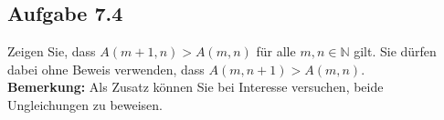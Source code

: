 \subsection*{Aufgabe 7.4}
Zeigen Sie, dass $A(m+1,n) > A(m,n)$ für alle $m,n \in \mathbb{N}$ gilt. Sie dürfen dabei ohne Beweis verwenden, dass $A(m,n+1) > A(m,n)$.\\
\textbf{Bemerkung:} Als Zusatz können Sie bei Interesse versuchen, beide Ungleichungen zu beweisen.